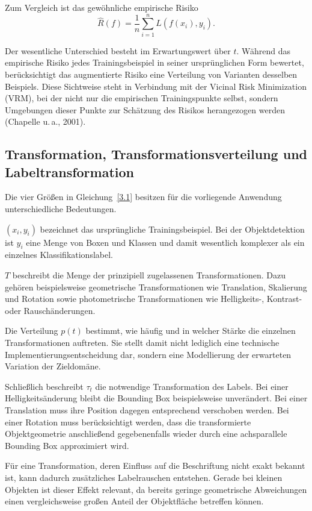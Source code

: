 Zum Vergleich ist das gewöhnliche empirische Risiko
\begin{equation}
\hat R(f)
=
\frac{1}{n}
\sum_{i=1}^{n}
L\left(f(x_i),y_i\right).
\tag{3.2}
\end{equation}

Der wesentliche Unterschied besteht im Erwartungswert über $t$. Während das empirische Risiko jedes Trainingsbeispiel in seiner ursprünglichen Form bewertet, berücksichtigt das augmentierte Risiko eine Verteilung von Varianten desselben Beispiels. Diese Sichtweise steht in Verbindung mit der Vicinal Risk Minimization (VRM), bei der nicht nur die empirischen Trainingspunkte selbst, sondern Umgebungen dieser Punkte zur Schätzung des Risikos herangezogen werden (Chapelle u.\,a., 2001).

\subsection{Transformation, Transformationsverteilung und Labeltransformation}

Die vier Größen in Gleichung~\eqref{3.1} besitzen für die vorliegende Anwendung unterschiedliche Bedeutungen.

$(x_i,y_i)$ bezeichnet das ursprüngliche Trainingsbeispiel. Bei der Objektdetektion ist $y_i$ eine Menge von Boxen und Klassen und damit wesentlich komplexer als ein einzelnes Klassifikationslabel.

$T$ beschreibt die Menge der prinzipiell zugelassenen Transformationen. Dazu gehören beispielsweise geometrische Transformationen wie Translation, Skalierung und Rotation sowie photometrische Transformationen wie Helligkeits-, Kontrast- oder Rauschänderungen.

Die Verteilung $p(t)$ bestimmt, wie häufig und in welcher Stärke die einzelnen Transformationen auftreten. Sie stellt damit nicht lediglich eine technische Implementierungsentscheidung dar, sondern eine Modellierung der erwarteten Variation der Zieldomäne.

Schließlich beschreibt $\tau_t$ die notwendige Transformation des Labels. Bei einer Helligkeitsänderung bleibt die Bounding Box beispielsweise unverändert. Bei einer Translation muss ihre Position dagegen entsprechend verschoben werden. Bei einer Rotation muss berücksichtigt werden, dass die transformierte Objektgeometrie anschließend gegebenenfalls wieder durch eine achsparallele Bounding Box approximiert wird.

Für eine Transformation, deren Einfluss auf die Beschriftung nicht exakt bekannt ist, kann dadurch zusätzliches Labelrauschen entstehen. Gerade bei kleinen Objekten ist dieser Effekt relevant, da bereits geringe geometrische Abweichungen einen vergleichsweise großen Anteil der Objektfläche betreffen können.

